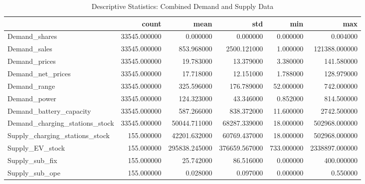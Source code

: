 \begin{table}
\caption{Descriptive Statistics: Combined Demand and Supply Data}
\label{tab:combined_descriptive_stats}
\begin{tabular}{lrrrrr}
\toprule
 & count & mean & std & min & max \\
\midrule
Demand_shares & 33545.000000 & 0.000000 & 0.000000 & 0.000000 & 0.004000 \\
Demand_sales & 33545.000000 & 853.968000 & 2500.121000 & 1.000000 & 121388.000000 \\
Demand_prices & 33545.000000 & 19.783000 & 13.379000 & 3.380000 & 141.580000 \\
Demand_net_prices & 33545.000000 & 17.718000 & 12.151000 & 1.788000 & 128.979000 \\
Demand_range & 33545.000000 & 325.596000 & 176.789000 & 52.000000 & 742.000000 \\
Demand_power & 33545.000000 & 124.323000 & 43.346000 & 0.852000 & 814.500000 \\
Demand_battery_capacity & 33545.000000 & 587.266000 & 838.372000 & 11.600000 & 2742.500000 \\
Demand_charging_stations_stock & 33545.000000 & 50044.711000 & 68287.339000 & 18.000000 & 502968.000000 \\
Supply_charging_stations_stock & 155.000000 & 42201.632000 & 60769.437000 & 18.000000 & 502968.000000 \\
Supply_EV_stock & 155.000000 & 295838.245000 & 376659.567000 & 733.000000 & 2338897.000000 \\
Supply_sub_fix & 155.000000 & 25.742000 & 86.516000 & 0.000000 & 400.000000 \\
Supply_sub_ope & 155.000000 & 0.028000 & 0.097000 & 0.000000 & 0.550000 \\
\bottomrule
\end{tabular}
\end{table}
